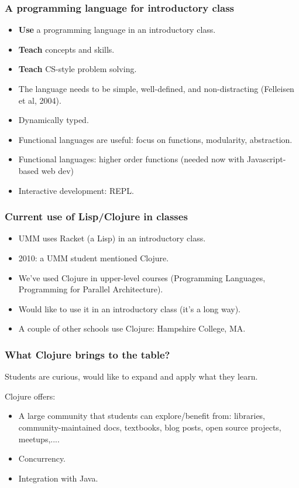 \documentclass{beamer}
\begin{document}
\begin{frame}
   \frametitle{A programming language for introductory class}
\begin{itemize}
\item {\bf Use} a programming language in an introductory class.
\item {\bf  Teach} concepts and skills.
\item {\bf  Teach} CS-style problem solving.
\item The language needs to be simple, well-defined, and non-distracting (Felleisen et al, 2004).
\item Dynamically typed.
\item Functional languages are useful: focus on functions, modularity, abstraction.
\item Functional languages: higher order functions (needed now with Javascript-based web dev)
\item Interactive development: REPL. 
\end{itemize}
\end{frame}

\begin{frame}
   \frametitle{Current use of Lisp/Clojure in classes}
\begin{itemize}
\item UMM uses Racket (a Lisp) in an introductory class. 
\item 2010: a UMM student mentioned Clojure. 
\item We've used Clojure in upper-level courses (Programming Languages, Programming for Parallel Architecture).
\item Would like to use it in an introductory class (it's a long way).
\item A couple of other schools use Clojure: Hampshire College, MA. 
\end{itemize}
\end{frame}

\begin{frame}
   \frametitle{What Clojure brings to the table?}
Students are curious, would like to expand and apply what they learn. 

Clojure offers:
\begin{itemize}
\item A large community that students can explore/benefit from: libraries, community-maintained docs, textbooks, blog posts, open source projects, meetups,....
\item Concurrency.
\item Integration with Java. 
\end{itemize}
\end{frame}
\end{document}
